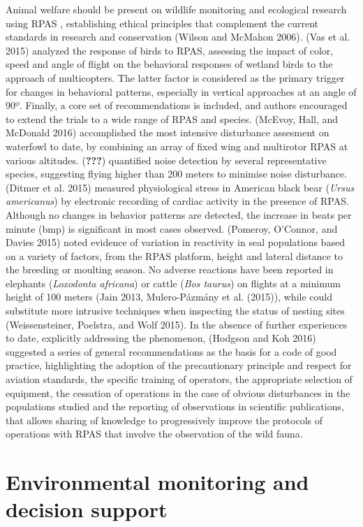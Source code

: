 \documentclass[]{interact}
\theoremstyle{plain}%
\theoremstyle{definition}
\theoremstyle{remark}
\begin{document}
Animal welfare should be present on wildlife monitoring and ecological
research using RPAS , establishing ethical principles that complement
the current standards in research and conservation (Wilson and McMahon
2006). (Vas et al. 2015) analyzed the response of birds to RPAS,
assessing the impact of color, speed and angle of flight on the
behavioral responses of wetland birds to the approach of multicopters.
The latter factor is considered as the primary trigger for changes in
behavioral patterns, especially in vertical approaches at an angle of
90º. Finally, a core set of recommendations is included, and authors
encouraged to extend the trials to a wide range of RPAS and species.
(McEvoy, Hall, and McDonald 2016) accomplished the most intensive
disturbance assesment on waterfowl to date, by combining an array of
fixed wing and multirotor RPAS at various altitudes. ({\textbf{???}})
quantified noise detection by several representative species, suggesting
flying higher than 200 meters to minimise noise disturbance. (Ditmer et
al. 2015) measured physiological stress in American black bear
(\emph{Ursus americanus}) by electronic recording of cardiac activity in
the presence of RPAS. Although no changes in behavior patterns are
detected, the increase in beats per minute (bmp) is significant in most
cases observed. (Pomeroy, O'Connor, and Davies 2015) noted evidence of
variation in reactivity in seal populations based on a variety of
factors, from the RPAS platform, height and lateral distance to the
breeding or moulting season. No adverse reactions have been reported in
elephants (\emph{Loxodonta africana}) or cattle (\emph{Bos taurus}) on
flights at a minimum height of 100 meters (Jain 2013, Mulero-Pázmány et
al. (2015)), while could substitute more intrusive techniques when
inspecting the status of nesting sites (Weissensteiner, Poelstra, and
Wolf 2015). In the absence of further experiences to date, explicitly
addressing the phenomenon, (Hodgson and Koh 2016) suggested a series of
general recommendations as the basis for a code of good practice,
highlighting the adoption of the precautionary principle and respect for
aviation standards, the specific training of operators, the appropriate
selection of equipment, the cessation of operations in the case of
obvious disturbances in the populations studied and the reporting of
observations in scientific publications, that allows sharing of
knowledge to progressively improve the protocols of operations with RPAS
that involve the observation of the wild fauna.

\section{Environmental monitoring and decision
support}\label{environmental-monitoring-and-decision-support}
\end{document}
